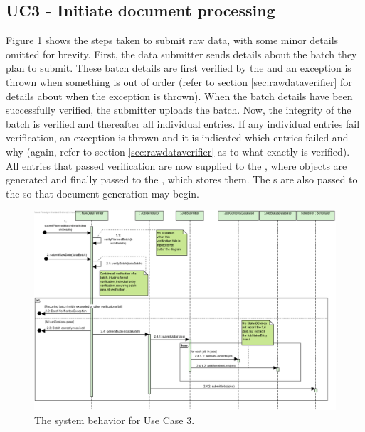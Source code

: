 \subsection{UC3 - Initiate document processing}
Figure \ref{fig:seq_uc3} shows the steps taken to submit raw data, with some minor details omitted for brevity. First, the data submitter sends details about the batch they plan to submit. These batch details are first verified by the  and an exception is thrown when something is out of order (refer to section \ref{sec:rawdataverifier} for details about when the exception is thrown). When the batch details have been successfully verified, the submitter uploads the batch. Now, the integrity of the batch is verified and thereafter all individual entries. If any individual entries fail verification, an exception is thrown and it is indicated which entries failed and why (again, refer to section \ref{sec:rawdataverifier} as to what exactly is verified). All entries that passed verification are now supplied to the , where  objects are generated and finally passed to the , which stores them. The s are also passed to the  so that document generation may begin. 

\begin{figure}[!htp]
    \centering
    \includegraphics[width=\textwidth]{figures/UC3 - Initiate document processing.png}
    \caption{The system behavior for Use Case 3.
        }\label{fig:seq_uc3}
\end{figure}

